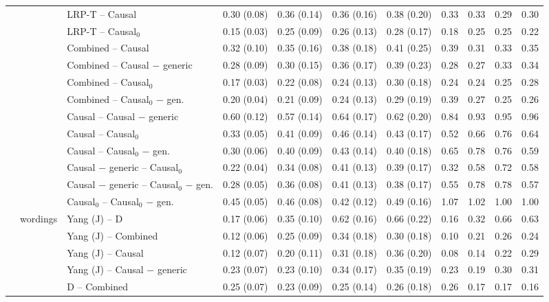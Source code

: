 \begin{tabular}{@{}lllrrrrrrrr@{}}
 &  & LRP-T -- Causal & 0.30 (0.08) & 0.36 (0.14) & 0.36 (0.16) & 0.38 (0.20) & 0.33 & 0.33 & 0.29 & 0.30 \\
 &  & LRP-T -- Causal$_0$ & 0.15 (0.03) & 0.25 (0.09) & 0.26 (0.13) & 0.28 (0.17) & 0.18 & 0.25 & 0.25 & 0.22 \\
 &  & Combined -- Causal & 0.32 (0.10) & 0.35 (0.16) & 0.38 (0.18) & 0.41 (0.25) & 0.39 & 0.31 & 0.33 & 0.35 \\
 &  & Combined -- Causal $-$ generic & 0.28 (0.09) & 0.30 (0.15) & 0.36 (0.17) & 0.39 (0.23) & 0.28 & 0.27 & 0.33 & 0.34 \\
 &  & Combined -- Causal$_0$ & 0.17 (0.03) & 0.22 (0.08) & 0.24 (0.13) & 0.30 (0.18) & 0.24 & 0.24 & 0.25 & 0.28 \\
 &  & Combined -- Causal$_0$ $-$ gen. & 0.20 (0.04) & 0.21 (0.09) & 0.24 (0.13) & 0.29 (0.19) & 0.39 & 0.27 & 0.25 & 0.26 \\
 &  & Causal -- Causal $-$ generic & 0.60 (0.12) & 0.57 (0.14) & 0.64 (0.17) & 0.62 (0.20) & 0.84 & 0.93 & 0.95 & 0.96 \\
 &  & Causal -- Causal$_0$ & 0.33 (0.05) & 0.41 (0.09) & 0.46 (0.14) & 0.43 (0.17) & 0.52 & 0.66 & 0.76 & 0.64 \\
 &  & Causal -- Causal$_0$ $-$ gen. & 0.30 (0.06) & 0.40 (0.09) & 0.43 (0.14) & 0.40 (0.18) & 0.65 & 0.78 & 0.76 & 0.59 \\
 &  & Causal $-$ generic -- Causal$_0$ & 0.22 (0.04) & 0.34 (0.08) & 0.41 (0.13) & 0.39 (0.17) & 0.32 & 0.58 & 0.72 & 0.58 \\
 &  & Causal $-$ generic -- Causal$_0$ $-$ gen. & 0.28 (0.05) & 0.36 (0.08) & 0.41 (0.13) & 0.38 (0.17) & 0.55 & 0.78 & 0.78 & 0.57 \\
 &  & Causal$_0$ -- Causal$_0$ $-$ gen. & 0.45 (0.05) & 0.46 (0.08) & 0.42 (0.12) & 0.49 (0.16) & 1.07 & 1.02 & 1.00 & 1.00 \\
\addlinespace
 & wordings & Yang (J) -- D & 0.17 (0.06) & 0.35 (0.10) & 0.62 (0.16) & 0.66 (0.22) & 0.16 & 0.32 & 0.66 & 0.63 \\
 &  & Yang (J) -- Combined & 0.12 (0.06) & 0.25 (0.09) & 0.34 (0.18) & 0.30 (0.18) & 0.10 & 0.21 & 0.26 & 0.24 \\
 &  & Yang (J) -- Causal & 0.12 (0.07) & 0.20 (0.11) & 0.31 (0.18) & 0.36 (0.20) & 0.08 & 0.14 & 0.22 & 0.29 \\
 &  & Yang (J) -- Causal $-$ generic & 0.23 (0.07) & 0.23 (0.10) & 0.34 (0.17) & 0.35 (0.19) & 0.23 & 0.19 & 0.30 & 0.31 \\
 &  & D -- Combined & 0.25 (0.07) & 0.23 (0.09) & 0.25 (0.14) & 0.26 (0.18) & 0.26 & 0.17 & 0.17 & 0.16 \\

\end{tabular}
